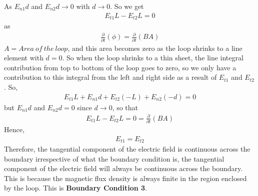As $E_{n1}d$ and $E_{n2}d\longrightarrow 0$ with $d \longrightarrow 0$. So we get 
\begin{align*}
E_{t1}L - E_{t2}L = 0
\end{align*}
as 
\begin{align*}
\frac{\partial}{\partial t}(\phi) = \frac{\partial}{\partial t}(BA
)
\end{align*}
$A =  Area\ of\ the\ loop$, and this area becomes zero as the loop shrinks to a line element with $d = 0$. So when the loop shrinks to a thin sheet, the line integral contribution from top to bottom of the loop goes to zero, so we only have a contribution to this integral from the left and right side as a result of $E_{t1}$ and $E_{t2}$. So, 
\begin{align*}
E_{t1}L + E_{n1}d +E_{t2}(-L) + E_{n2}(-d) = 0
\end{align*}
but $E_{n1}d$ and $E_{n2}d = 0$ since $d \longrightarrow 0$, so that 
\begin{align*}
E_{t1}L - E_{t2}L = 0 = \frac{\partial}{\partial t}(BA)
\end{align*}
Hence,
\begin{align*}
E_{t1} = E_{t2}
\end{align*}
Therefore, the tangential component of the electric field is continuous across the boundary irrespective of what the boundary condition is, the tangential component of the electric field will always be continuous across the boundary. This is because the magnetic flux density is always finite in the region enclosed by the loop. This is \textbf{Boundary Condition 3}. 

